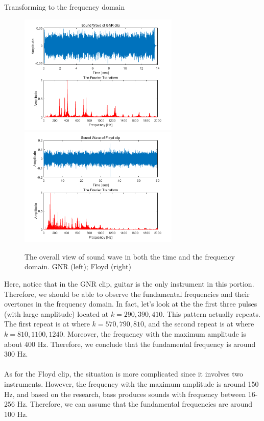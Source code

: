 \documentclass{article}
\begin{document}
\begin{algorithm}
\begin{algorithmic}
\end{algorithmic}
\caption{Transforming to the frequency domain}
\end{algorithm}
\begin{figure}[h]
    \centerline{\includegraphics[width=3in]{overall_GNR.png}\includegraphics[width=3in]{overall_Floyd.png}}
    \caption{The overall view of sound wave in both the time and the frequency domain. GNR (left); Floyd (right)}
\end{figure}

Here, notice that in the GNR clip, guitar is the only instrument in this portion. Therefore, we should be able to observe the fundamental frequencies and their overtones in the frequency domain. In fact, let's look at the the first three pulses (with large amplitude) located at $k=290, 390, 410$. This pattern actually repeats. The first repeat is at where $k=570,790,810$, and the second repeat is at where $k=810,1100,1240$. Moreover, the frequency with the maximum amplitude is about 400 Hz. Therefore, we conclude that the fundamental frequency is around 300 Hz. \\
~\\
As for the Floyd clip, the situation is more complicated since it involves two instruments. However, the frequency with the maximum amplitude is around 150 Hz, and based on the research, bass produces sounds with frequency between 16-256 Hz. Therefore, we can assume that the fundamental frequencies are around 100 Hz.
\end{document}
